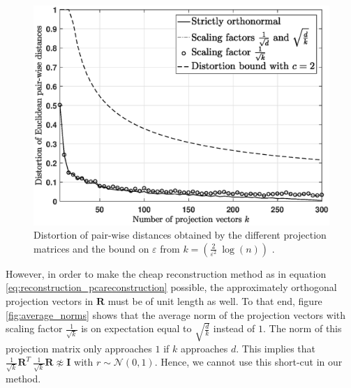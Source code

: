 \begin{figure}[h]
	\centering
	\vspace{-0.1cm}
	\includegraphics[scale=0.4]{rp-method/Distortion_distances}
	\vspace{-0.1cm}
	\caption{Distortion of pair-wise distances obtained by the different projection matrices and the bound on $\varepsilon$ from $k=(\frac{2}{\varepsilon^2} \ \log(n))$ \cite{venkatasubramanian2011johnson}.}
	\label{fig:distortion_distances}
\end{figure}

\newpage
However, in order to make the cheap reconstruction method as in equation \eqref{eq:reconstruction_pcareconstruction} possible, the approximately orthogonal projection vectors in $\mathbf{R}$ must be of unit length as well. To that end, figure \ref{fig:average_norms} shows that the average norm of the projection vectors with scaling factor $\frac{1}{\sqrt{k}}$ is on expectation equal to $\sqrt{\frac{d}{k}}$ instead of $1$. The norm of this projection matrix only approaches $1$ if $k$ approaches $d$. This implies that $\frac{1}{\sqrt{k}} \mathbf{R}^T \ \frac{1}{\sqrt{k}} \mathbf{R} \not\approx \mathbf{I}$ with $r \sim \mathcal{N}(0,1)$. Hence, we cannot use this short-cut in our method.


